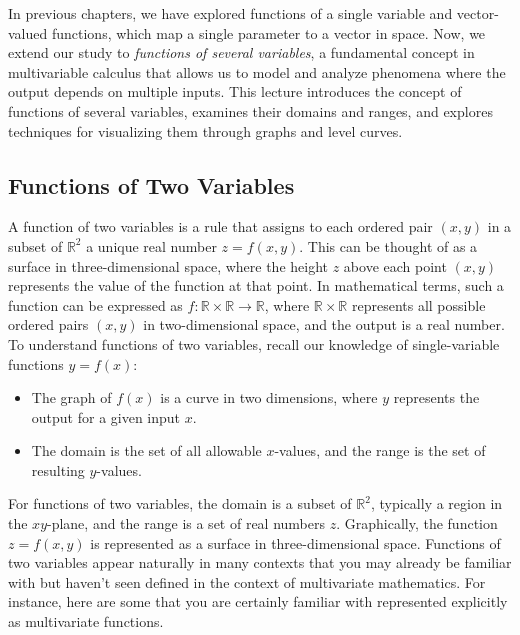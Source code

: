\noindent In previous chapters, we have explored functions of a single variable and vector-valued functions, which map a single parameter to a vector in space. Now, we extend our study to \textit{functions of several variables}, a fundamental concept in multivariable calculus that allows us to model and analyze phenomena where the output depends on multiple inputs. This lecture introduces the concept of functions of several variables, examines their domains and ranges, and explores techniques for visualizing them through graphs and level curves.

\subsection*{Functions of Two Variables} 

\noindent A function of two variables is a rule that assigns to each ordered pair \( (x, y) \) in a subset of \( \mathbb{R}^2 \) a unique real number \( z = f(x, y) \). This can be thought of as a surface in three-dimensional space, where the height \( z \) above each point \( (x, y) \) represents the value of the function at that point. In mathematical terms, such a function can be expressed as \( f: \mathbb{R} \times \mathbb{R} \to \mathbb{R} \), where \( \mathbb{R} \times \mathbb{R} \) represents all possible ordered pairs \( (x, y) \) in two-dimensional space, and the output is a real number. To understand functions of two variables, recall our knowledge of single-variable functions \( y = f(x) \):
\begin{itemize}
    \item The graph of \( f(x) \) is a curve in two dimensions, where \( y \) represents the output for a given input \( x \).
    \item The domain is the set of all allowable \( x \)-values, and the range is the set of resulting \( y \)-values.
\end{itemize}
For functions of two variables, the domain is a subset of \( \mathbb{R}^2 \), typically a region in the \( xy \)-plane, and the range is a set of real numbers \( z \). Graphically, the function \( z = f(x, y) \) is represented as a surface in three-dimensional space. Functions of two variables appear naturally in many contexts that you may already be familiar with but haven't seen defined in the context of multivariate mathematics. For instance, here are some that you are certainly familiar with represented explicitly as multivariate functions.

